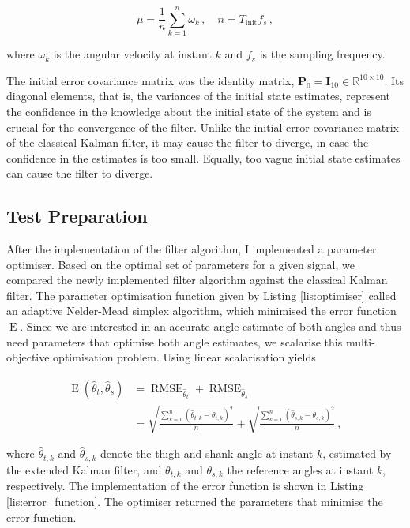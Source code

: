 \begin{equation}
  \mu = \frac{1}{n} \sum_{k=1}^{n}{\omega_k}\,, \quad n = T_{\text{init}} f_s\,,
\end{equation}

\noindent
where $\omega_k$ is the angular velocity at instant $k$ and $f_s$ is the sampling frequency.

The initial error covariance matrix was the identity matrix, $\mathbf{P}_0 = \mathbf{I}_{10} \in \mathbb{R}^{10\times10}$. Its diagonal elements, that is, the variances of the initial state estimates, represent the confidence in the knowledge about the initial state of the system and is crucial for the convergence of the filter. Unlike the initial error covariance matrix of the classical Kalman filter, it may cause the filter to diverge, in case the confidence in the estimates is too small. Equally, too vague initial state estimates can cause the filter to diverge.

\subsection{Test Preparation}

After the implementation of the filter algorithm, I implemented a parameter optimiser. Based on the optimal set of parameters for a given signal, we compared the newly implemented filter algorithm against the classical Kalman filter. The parameter optimisation function given by Listing \ref{lis:optimiser} called an adaptive Nelder-Mead simplex algorithm, which minimised the error function $\operatorname{E}$. Since we are interested in an accurate angle estimate of both angles and thus need parameters that optimise both angle estimates, we scalarise this multi-objective optimisation problem. Using linear scalarisation yields

\begin{equation}
\begin{split}
  \operatorname{E}(\hat{\theta}_t, \hat{\theta}_s) &= \operatorname{RMSE}_{\hat{\theta}_{t}} + \operatorname{RMSE}_{\hat{\theta}_s} \\
  &= \sqrt{\frac{\sum_{k=1}^n (\hat{\theta}_{t, k} - \theta_{t, k})^2}{n}} + \sqrt{\frac{\sum_{k=1}^n (\hat{\theta}_{s, k} - \theta_{s, k})^2}{n}}\,,
\end{split}
\end{equation}

\noindent
where $\hat{\theta}_{t,k}$ and $\hat{\theta}_{s,k}$ denote the thigh and shank angle at instant $k$, estimated by the extended Kalman filter, and $\theta_{t, k}$ and $\theta_{s, k}$ the reference angles at instant $k$, respectively. The implementation of the error function is shown in Listing \ref{lis:error_function}. The optimiser returned the parameters that minimise the error function.

